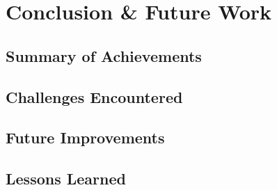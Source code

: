 \chapter{Conclusion \& Future Work}


\section{Summary of Achievements}

\section{Challenges Encountered}

\section{Future Improvements}

\section{Lessons Learned}
